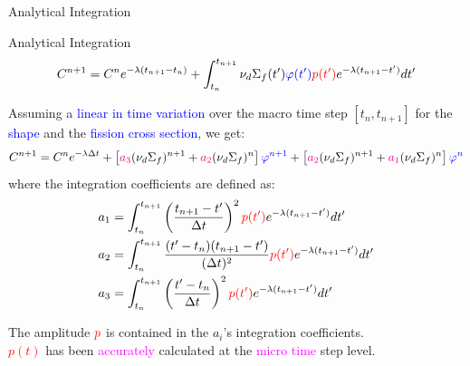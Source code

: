 \documentclass[8pt]{beamer}
\newcommand{\tcr}[1]{\textcolor{red}{#1}}
\newcommand{\tcb}[1]{\textcolor{blue}{#1}}
\newcommand{\tcm}[1]{\textcolor{magenta}{#1}}
\begin{document}
\begin{frame}{Analytical Integration}


\begin{block}{Analytical Integration}
\[
C^{n+1} =  C^n e^{-\lambda (t_{n+1} - t_n) }  + \int_{t_n}^{t_{n+1}} \nu_d\Sigma_f(t')\tcb{\varphi(t')} \tcr{p(t')} e^{-\lambda (t_{n+1}-t')}dt'
\]
\end{block}

\begin{block}{}
Assuming a \tcb{linear in time variation} over the macro time step $[t_n, t_{n+1}]$ for the \tcb{shape} and the \tcb{fission cross section}, we get:
\[
C^{n+1} = C^n e^{-\lambda \Delta t} 
+ \left[\tcm{a_3}(\nu_d\Sigma_f)^{n+1}+\tcm{a_2}(\nu_d\Sigma_f)^n\right]\tcb{\varphi^{n+1}}
+ \left[\tcm{a_2}(\nu_d\Sigma_f)^{n+1}+\tcm{a_1}(\nu_d\Sigma_f)^n\right]\tcb{\varphi^n    }
\]
where the integration coefficients are defined as:
\begin{align}
&a_1 = \int_{t_n}^{t_{n+1}}\left(\frac{t_{n+1}-t'}{\Delta t}\right)^2 \tcr{p(t')} e^{-\lambda(t_{n+1}-t')}dt' \notag \\
&a_2= \int_{t_n}^{t_{n+1}}\frac{(t'-t_n)(t_{n+1}-t')}{(\Delta t)^2}   \tcr{p(t')} e^{-\lambda(t_{n+1}-t')}dt'   \notag \\
&a_3 = \int_{t_n}^{t_{n+1}}\left(\frac{t'-t_n}{\Delta t}\right)^2     \tcr{p(t')} e^{-\lambda(t_{n+1}-t')}dt'     \notag 
\end{align}


The amplitude $\tcr{p}$ is contained in the $a_i$'s integration coefficients.\\
\tcr{$p(t)$} has been \tcm{accurately} calculated at the \tcm{micro time} step level.

\end{block}

\end{frame}

%
%
%
%
%
\end{document}
